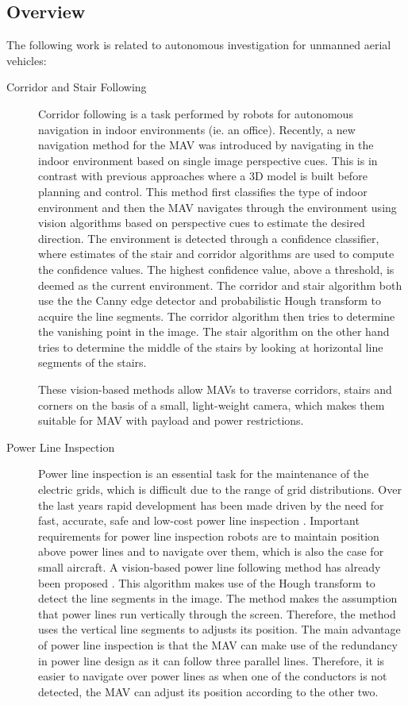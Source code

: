 \documentclass[a4paper]{article}
\begin{document}
\subsection{Overview}
The following work is related to autonomous investigation for unmanned aerial vehicles:
\begin{description}
\item[Corridor and Stair Following] Corridor following is a task performed by robots for autonomous navigation in indoor environments (ie. an office). Recently, a new navigation method for the MAV \cite{Bills2011} was introduced by navigating in the indoor environment based on single image perspective cues. This is in contrast with previous approaches where a 3D model is built before planning and control. This method first classifies the type of indoor environment and then the MAV navigates through the environment using vision algorithms based on perspective cues to estimate the desired direction. The environment is detected through a confidence classifier, where estimates of the stair and corridor algorithms are used to compute the confidence values. The highest confidence value, above a threshold, is deemed as the current environment. The corridor and stair algorithm both use the the Canny edge detector and probabilistic Hough transform to acquire the line segments. The corridor algorithm then tries to determine the vanishing point in the image. The stair algorithm on the other hand tries to determine the middle of the stairs by looking at horizontal line segments of the stairs.

These vision-based methods allow MAVs to traverse corridors, stairs and corners on the basis of a small, light-weight camera, which makes them suitable for MAV with payload and power restrictions.

\item[Power Line Inspection] Power line inspection is an essential task for the maintenance of the electric grids, which is difficult due to the range of grid distributions. Over the last years rapid development has been made driven by the need for fast, accurate, safe and low-cost power line inspection \cite{Katrasnik2010}. Important requirements for power line inspection robots are to maintain position above power lines and to navigate over them, which is also the case for small aircraft. A vision-based power line following method has already been proposed \cite{Golightly2005}. This algorithm makes use of the Hough transform to detect the line segments in the image. The method makes the assumption that power lines run vertically through the screen. Therefore, the method uses the vertical line segments to adjusts its position. The main advantage of power line inspection is that the MAV can make use of the redundancy in power line design as it can follow three parallel lines. Therefore, it is easier to navigate over power lines as when one of the conductors is not detected, the MAV can adjust its position according to the other two.


\end{description}
\end{document}
